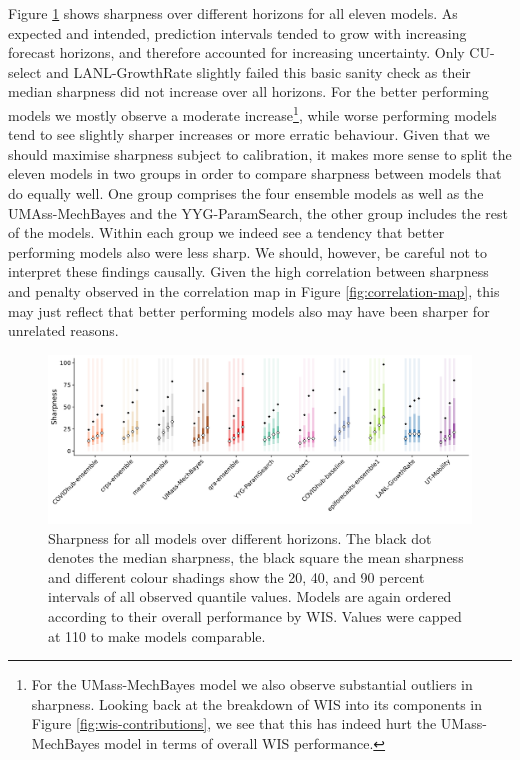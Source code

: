 \documentclass[
]{book}
\begin{document}
Figure \ref{fig:sharpness-horizons} shows sharpness over different horizons for all eleven models. As expected and intended, prediction intervals tended to grow with increasing forecast horizons, and therefore accounted for increasing uncertainty. Only CU-select and LANL-GrowthRate slightly failed this basic sanity check as their median sharpness did not increase over all horizons. For the better performing models we mostly observe a moderate increase\footnote{For the UMass-MechBayes model we also observe substantial outliers in sharpness. Looking back at the breakdown of WIS into its components in Figure \ref{fig:wis-contributions}, we see that this has indeed hurt the UMass-MechBayes model in terms of overall WIS performance.}, while worse performing models tend to see slightly sharper increases or more erratic behaviour. Given that we should maximise sharpness subject to calibration, it makes more sense to split the eleven models in two groups in order to compare sharpness between models that do equally well. One group comprises the four ensemble models as well as the UMAss-MechBayes and the YYG-ParamSearch, the other group includes the rest of the models.
Within each group we indeed see a tendency that better performing models also were less sharp. We should, however, be careful not to interpret these findings causally. Given the high correlation between sharpness and penalty observed in the correlation map in Figure \ref{fig:correlation-map}, this may just reflect that better performing models also may have been sharper for unrelated reasons.

\begin{figure}
\includegraphics[width=1\linewidth]{../visualisation/chapter-5-results/scenario-baseline/sharpness-horizons} \caption{Sharpness for all models over different horizons. The black dot denotes the median sharpness, the black square the mean sharpness and different colour shadings show the 20, 40, and 90 percent intervals of all observed quantile values. Models are again ordered according to their overall performance by WIS. Values were capped at 110 to make models comparable.}\label{fig:sharpness-horizons}
\end{figure}
\end{document}
